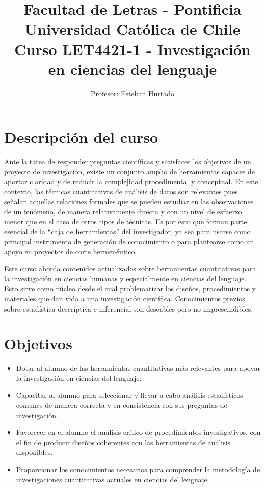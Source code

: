 \documentclass[letterpaper,11pt]{article}
\title{{\Large Facultad de Letras - Pontificia Universidad Católica de Chile } \\ Curso LET4421-1 - Investigación en ciencias del lenguaje}
\author{Profesor: Esteban Hurtado}
\begin{document}
\maketitle


\section{Descripci\'on del curso}

Ante la tarea de responder preguntas científicas y satisfacer los objetivos de un proyecto de investigación, existe un conjunto amplio de herramientas capaces de aportar claridad y de reducir la complejidad procedimental y conceptual. En este contexto, las técnicas cuantitativas de análisis de datos son relevantes pues señalan aquellas relaciones formales que se pueden estudiar en las observaciones de un fenómeno, de manera relativamente directa y con un nivel de esfuerzo menor que en el caso de otros tipos de técnicas. Es por esto que forman parte esencial de la ``caja de herramientas'' del investigador, ya sea para usarse como principal instrumento de generación de conocimiento o para plantearse como un apoyo en proyectos de corte hermenéutico.

Este curso aborda contenidos actualizados sobre herramientas cuantitativas para la investigación en ciencias humanas y especialmente en ciencias del lenguaje. Esto sirve como núcleo desde el cual problematizar los diseños, procedimientos y materiales que dan vida a una investigación científica. Conocimientos previos sobre estadística descriptiva e inferencial son deseables pero no imprescindibles.

\section{Objetivos}

\begin{itemize}
  \item Dotar al alumno de las herramientas cuantitativas más relevantes para apoyar la investigación en ciencias del lenguaje.
    
  \item Capacitar al alumno para seleccionar y llevar a cabo análisis estadísticos comunes de manera correcta y en consistencia con sus preguntas de investigación.
  
  \item Favorecer en el alumno el análisis crítico de procedimientos investigativos, con el fin de producir diseños coherentes con las herramientas de análisis disponibles.
  
  \item Proporcionar los conocimientos necesarios para comprender la metodología de investigaciones cuantitativas actuales en ciencias del lenguaje.


\end{itemize}
\end{document}
